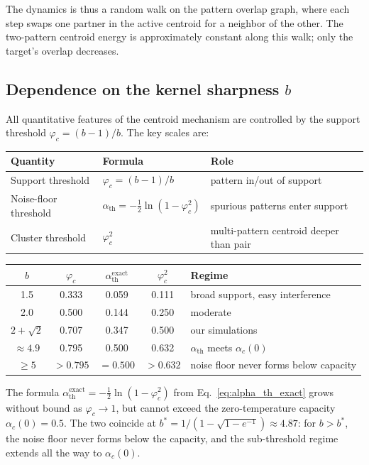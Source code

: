 \documentclass[11pt]{article}
\begin{document}
The dynamics is thus a random walk on the pattern overlap graph, where each step swaps one partner in the active centroid for a neighbor of the other.  The two-pattern centroid energy is approximately constant along this walk; only the target's overlap decreases.

\subsection{Dependence on the kernel sharpness $b$}

All quantitative features of the centroid mechanism are controlled by the support threshold $\varphi_c = (b-1)/b$.  The key scales are:

\begin{center}
\begin{tabular}{lll}
\toprule
Quantity & Formula & Role \\
\midrule
Support threshold & $\varphi_c = (b-1)/b$ & pattern in/out of support \\
Noise-floor threshold & $\alpha_{\mathrm{th}} = -\tfrac{1}{2}\ln(1-\varphi_c^2)$ & spurious patterns enter support \\
Cluster threshold & $\varphi_c^2$ & multi-pattern centroid deeper than pair \\
\bottomrule
\end{tabular}
\end{center}

\begin{center}
\begin{tabular}{ccccl}
\toprule
$b$ & $\varphi_c$ & $\alpha_{\mathrm{th}}^{\mathrm{exact}}$ & $\varphi_c^2$ & Regime \\
\midrule
1.5 & 0.333 & 0.059 & 0.111 & broad support, easy interference \\
2.0 & 0.500 & 0.144 & 0.250 & moderate \\
$2\!+\!\sqrt{2}$ & 0.707 & 0.347 & 0.500 & our simulations \\
$\approx 4.9$ & 0.795 & 0.500 & 0.632 & $\alpha_{\mathrm{th}}$ meets $\alpha_c(0)$ \\
$\geq 5$ & $> 0.795$ & $= 0.500$ & $> 0.632$ & noise floor never forms below capacity \\
\bottomrule
\end{tabular}
\end{center}
The formula $\alpha_{\mathrm{th}}^{\mathrm{exact}} = -\tfrac{1}{2}\ln(1-\varphi_c^2)$ from Eq.~\eqref{eq:alpha_th_exact} grows without bound as $\varphi_c \to 1$, but cannot exceed the zero-temperature capacity $\alpha_c(0) = 0.5$.  The two coincide at $b^* = 1/(1-\sqrt{1-e^{-1}}) \approx 4.87$: for $b > b^*$, the noise floor never forms below the capacity, and the sub-threshold regime extends all the way to $\alpha_c(0)$.
\end{document}
